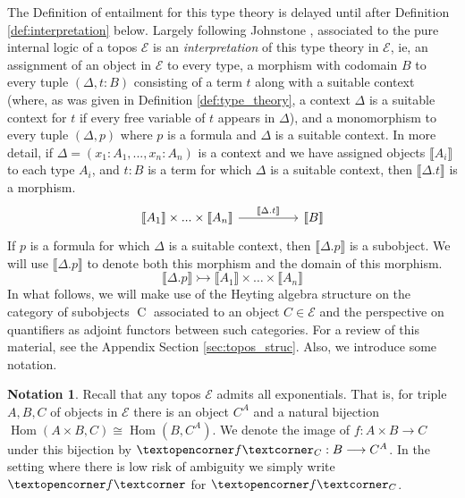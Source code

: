 \documentclass{birkjour}
\theoremstyle{plain}
\theoremstyle{definition}
\newtheorem{notation}[thm]{Notation}
\newcommand{\call}[1]{\mathcal{#1}}
\newcommand{\adj}[1]{\text{\textopencorner}{#1}\text{\textcorner}}
\newcommand{\lto}{\longrightarrow}
\begin{document}
	The Definition of entailment for this type theory is delayed until after Definition \ref{def:interpretation} below.
	Largely following Johnstone \cite[\S D4.1]{Johnstone}, associated to the pure internal logic of a topos $\call{E}$ is an \emph{interpretation} of this type theory in $\call{E}$, ie, an assignment of an object in $\call{E}$ to every type, a morphism with codomain $B$ to every tuple $(\Delta,t:B)$ consisting of a term $t$ along with a suitable context (where, as was given in Definition \ref{def:type_theory}, a context $\Delta$  is a suitable context for $t$ if every free variable of $t$ appears in $\Delta$), and a monomorphism to every tuple $(\Delta, p)$ where $p$ is a formula and $\Delta$ is a suitable context. In more detail, if $\Delta = (x_1:A_1,...,x_n:A_n)$ is a context and we have assigned objects $\llbracket A_i\rrbracket$ to each type $A_i$, and $t:B$ is a term for which $\Delta$ is a suitable context, then $\llbracket \Delta . t \rrbracket$ is a morphism.
	\[
	\begin{tikzcd}[column sep = huge]
		\llbracket A_1 \rrbracket \times ... \times \llbracket A_n \rrbracket\arrow[r,"{\llbracket \Delta . t\rrbracket}"] & \llbracket B \rrbracket
	\end{tikzcd}
	\]
	If $p$ is a formula for which $\Delta$ is a suitable context, then $\llbracket \Delta . p \rrbracket$ is a subobject. We will use $\llbracket \Delta. p \rrbracket$ to denote both this morphism and the domain of this morphism.
	\begin{equation}
		\llbracket \Delta. p \rrbracket \rightarrowtail \llbracket A_1 \rrbracket \times \hdots \times \llbracket A_n \rrbracket
	\end{equation}
	In what follows, we will make use of the Heyting algebra structure on the category of subobjects $\operatorname{C}$ associated to an object $C \in \call{E}$ and the perspective on quantifiers as adjoint functors between such categories. For a review of this material, see the Appendix Section \ref{sec:topos_struc}. Also, we introduce some notation.
	\begin{notation}\label{not:adj}
		Recall that any topos $\call{E}$ admits all exponentials. That is, for triple $A,B,C$ of objects in $\call{E}$ there is an object $C^A$ and a natural bijection $\operatorname{Hom}(A \times B, C) \cong \operatorname{Hom}(B,C^A)$. We denote the image of $f:A \times B \lto C$ under this bijection by $\adj{f}_C: B \lto C^A$. In the setting where there is low risk of ambiguity we simply write $\adj{f}$ for $\adj{f}_C$.
	\end{notation}
\end{document}
